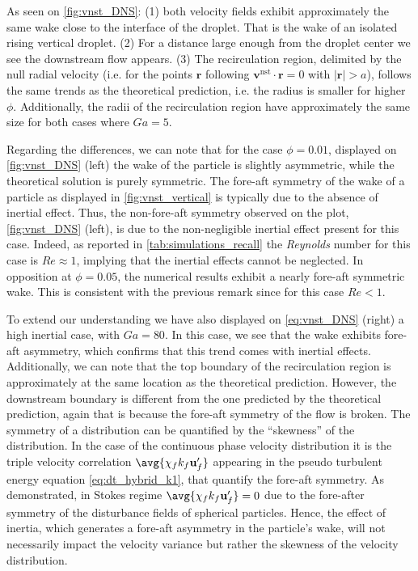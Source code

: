 As seen on \ref{fig:vnst_DNS}:  %
(1) both velocity fields exhibit approximately the same wake close to the interface of the droplet. 
That is the wake of an isolated rising vertical droplet. 
(2) For a distance large enough from the droplet center we see the downstream flow appears.
(3) The recirculation region, delimited by the null radial velocity (i.e. for the points $\textbf{r}$ following $\textbf{v}^\text{nst}\cdot \textbf{r} = 0$ with $|\textbf{r}|>a$), follows the same trends as the theoretical prediction, i.e. the radius is smaller for higher $\phi$. 
Additionally, the radii of the recirculation region have approximately the same size for both cases where $Ga = 5$. 

Regarding the differences, we can note that for the case $\phi = 0.01$, displayed on \ref{fig:vnst_DNS} (left) the wake of the particle is slightly asymmetric, while the theoretical solution is purely symmetric. 
The fore-aft symmetry of the wake of a particle as displayed in \ref{fig:vnst_vertical} is typically due to the absence of inertial effect. 
Thus, the non-fore-aft symmetry observed on the plot, \ref{fig:vnst_DNS} (left), is due to the non-negligible inertial effect present for this case. 
Indeed, as reported in \ref{tab:simulations_recall} the \textit{Reynolds} number for this case is $Re \approx 1$, implying that the inertial effects cannot be neglected. 
In opposition at $\phi = 0.05$, the numerical results exhibit a nearly fore-aft symmetric wake. 
This is consistent with the previous remark since for this case $Re < 1$. 

To extend our understanding we have also displayed on \ref{eq:vnst_DNS} (right) a high inertial case, with  $Ga = 80$. 
In this case, we see that the wake exhibits fore-aft asymmetry, which confirms that this trend comes with inertial effects. 
Additionally, we can note that the top boundary of the recirculation region is approximately at the same location as the theoretical prediction. 
However, the downstream boundary is different from the one predicted by the theoretical prediction, again that is because the fore-aft symmetry of the flow is broken.  
The symmetry of a distribution can be quantified by the ``skewness'' of the distribution. 
In the case of the continuous phase velocity distribution it is the triple velocity correlation $\avg{\chi_fk_f  \textbf{u}_f'}$ appearing in the pseudo turbulent energy equation \eqref{eq:dt_hybrid_k1}, that quantify the fore-aft symmetry.
As demonstrated, in Stokes regime $\avg{\chi_fk_f  \textbf{u}_f'} = 0$ due to the fore-after symmetry of the disturbance fields of spherical particles.  
Hence, the effect of inertia, which generates a fore-aft asymmetry in the particle's wake, will not necessarily impact the velocity variance but rather the skewness of the velocity distribution. 


